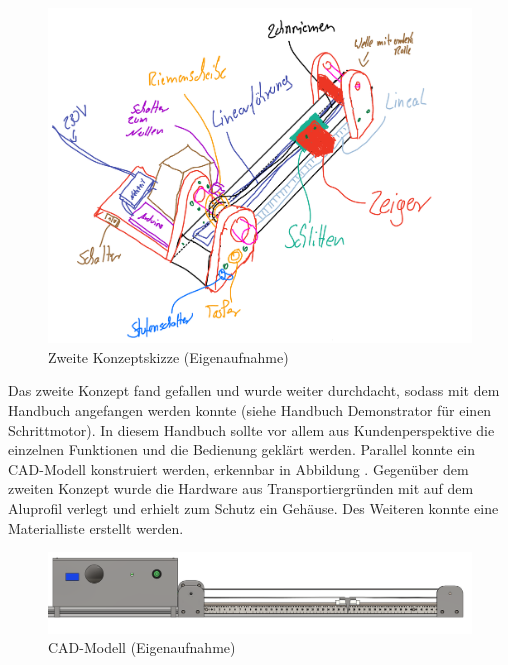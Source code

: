 \begin{figure}[H]
	\begin{center}
		\includegraphics[width=\textwidth]{Images/Konzeptskizze2.png}
		\caption{Zweite Konzeptskizze (Eigenaufnahme)} \label{ZweiteKonzeptskizze}
	\end{center}
\end{figure}

Das zweite Konzept fand gefallen und wurde weiter durchdacht, sodass mit dem Handbuch angefangen werden konnte (siehe Handbuch Demonstrator für einen Schrittmotor). In diesem Handbuch sollte vor allem aus Kundenperspektive die einzelnen Funktionen und die Bedienung geklärt werden. Parallel konnte ein CAD-Modell konstruiert werden, erkennbar in Abbildung . Gegenüber dem zweiten Konzept wurde die Hardware aus Transportiergründen mit auf dem Aluprofil verlegt und erhielt zum Schutz ein Gehäuse. Des Weiteren konnte eine Materialliste erstellt werden. 

\begin{figure}[H]
	\begin{center}
		\includegraphics[width=\textwidth]{Images/Konstruktion1.png}
		\caption{CAD-Modell (Eigenaufnahme)} \label{CADMOD}
	\end{center}
\end{figure} 

